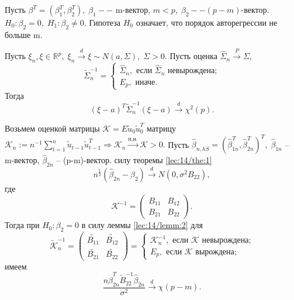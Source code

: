 Пусть $\beta^T = (\beta_1^T, \beta_2^T), \; \beta_1 -- $ m-вектор, $m<p, \; \beta_2--(p-m)$-вектор. $H_0: \beta_2 = 0, \; H_1: \beta_2 \neq 0.$ Гипотеза $H_0$ означает, что порядок авторегрессии не больше m.

\begin{lemma}\label{lec:14/lemm:2}
    Пусть $\xi_n, \xi \in \mathbb{R}^p, \; \xi_n \stackrel{d}{\to} \xi \sim N(a, \Sigma), \; \Sigma > 0.$ Пусть оценка $\hat{\Sigma}_n \stackrel{P}{\to} \Sigma,$
    \begin{equation}
        \tilde{\Sigma}_n^{-1} =
        \begin{cases}
            \hat{\Sigma}_n, \text{ если } \hat{\Sigma}_n \text{ невырождена;}\\
            E_p, \text{ иначе.}
        \end{cases}
    \end{equation}
    Тогда
    $$(\xi - a)^T\tilde{\Sigma}_n^{-1}(\xi - a) \stackrel{d}{\to} \chi^2(p).$$
\end{lemma}

Возьмем оценкой матрицы $\mathcal{K} = E\tilde{u}_0\tilde{u}_0^T$ матрицу $\mathcal{K}_n := n^{-1}\sum\limits_{t = 1}^n \tilde{u}_{t - 1}\tilde{u}_{t - 1}^T \Longrightarrow \mathcal{K}_n \stackrel{\text{п.н.}}{\to} \mathcal{K} > 0.$ Пусть $\hat{\beta}_{n, hS} = (\hat{\beta}_{1n}^T, \hat{\beta}_{2n}^T)^T, \; \hat{\beta}_{1n}$ -- m-вектор, $\hat{\beta}_{2n}$ -- (p-m)-вектор. силу теоремы \ref{lec:14/the:1}
$$n^{\frac{1}{2}}(\hat{\beta}_{2n} - \beta_2) \stackrel{d}{\to} N(0, \sigma^2 B_{22}),$$
где 
\begin{equation}
    \mathcal{K}^{-1} = 
    \begin{pmatrix}
      B_{11} & B_{12}\\
      B_{21} & B_{22}
    \end{pmatrix}.
\end{equation}
Тогда при $H_0: \beta_2 = 0$ в силу леммы \ref{lec:14/lemm:2} для
\begin{equation}
    \tilde{\mathcal{K}}_n^{-1} = 
    \begin{pmatrix}
      \tilde{B_{11}} & \tilde{B_{12}}\\
      \tilde{B_{21}} & \tilde{B_{22}}
    \end{pmatrix} =
    \begin{cases}
        \mathcal{K}_n^{-1}, \text{ если } \mathcal{K} \text{ невырождена;}\\
        E_p, \text{ если } \mathcal{K} \text{ вырождена;}
    \end{cases}
\end{equation}
имеем
$$\dfrac{n\hat{\beta}_{2n}^T \tilde{B}_{22}^{-1} \hat{\beta}_{2n}}{\sigma^2} \stackrel{d}{\to} \chi(p - m).$$

